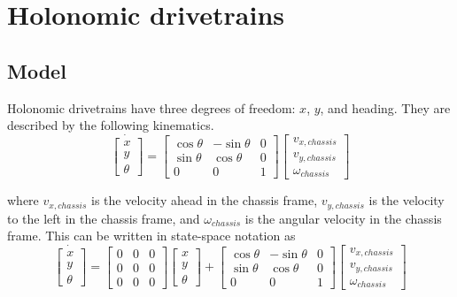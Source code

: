 \section{Holonomic drivetrains}

\subsection{Model}

Holonomic drivetrains have three degrees of freedom: $x$, $y$, and heading. They
are described by the following kinematics.
\begin{equation*}
  \dot{\begin{bmatrix}
    x \\
    y \\
    \theta
  \end{bmatrix}} =
  \begin{bmatrix}
    \cos\theta & -\sin\theta & 0 \\
    \sin\theta & \cos\theta & 0 \\
    0 & 0 & 1
  \end{bmatrix}
  \begin{bmatrix}
    v_{x,chassis} \\
    v_{y,chassis} \\
    \omega_{chassis}
  \end{bmatrix}
\end{equation*}

where $v_{x,chassis}$ is the velocity ahead in the chassis frame,
$v_{y,chassis}$ is the velocity to the left in the chassis frame, and
$\omega_{chassis}$ is the angular velocity in the chassis frame. This can be
written in state-space notation as
\begin{equation*}
  \dot{\begin{bmatrix}
    x \\
    y \\
    \theta
  \end{bmatrix}} =
  \begin{bmatrix}
    0 & 0 & 0 \\
    0 & 0 & 0 \\
    0 & 0 & 0
  \end{bmatrix}
  \begin{bmatrix}
    x \\
    y \\
    \theta
  \end{bmatrix} +
  \begin{bmatrix}
    \cos\theta & -\sin\theta & 0 \\
    \sin\theta & \cos\theta & 0 \\
    0 & 0 & 1
  \end{bmatrix}
  \begin{bmatrix}
    v_{x,chassis} \\
    v_{y,chassis} \\
    \omega_{chassis}
  \end{bmatrix}
\end{equation*}

